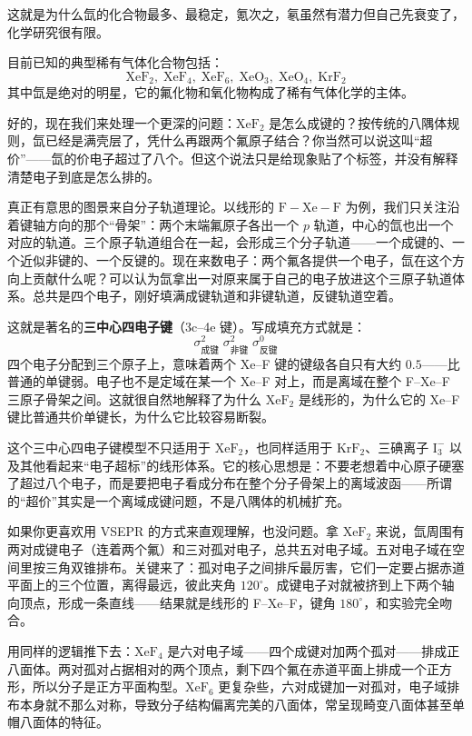 \documentclass[UTF8]{ctexbook}
\begin{document}
这就是为什么氙的化合物最多、最稳定，氪次之，氡虽然有潜力但自己先衰变了，化学研究很有限。

目前已知的典型稀有气体化合物包括：
\[
\mathrm{XeF_2,\; XeF_4,\; XeF_6,\; XeO_3,\; XeO_4,\; KrF_2}
\]
其中氙是绝对的明星，它的氟化物和氧化物构成了稀有气体化学的主体。

\medskip

好的，现在我们来处理一个更深的问题：$\mathrm{XeF_2}$ 是怎么成键的？按传统的八隅体规则，氙已经是满壳层了，凭什么再跟两个氟原子结合？你当然可以说这叫“超价”——氙的价电子超过了八个。但这个说法只是给现象贴了个标签，并没有解释清楚电子到底是怎么排的。

真正有意思的图景来自分子轨道理论。以线形的 $\mathrm{F\!-\!Xe\!-\!F}$ 为例，我们只关注沿着键轴方向的那个“骨架”：两个末端氟原子各出一个 $p$ 轨道，中心的氙也出一个对应的轨道。三个原子轨道组合在一起，会形成三个分子轨道——一个成键的、一个近似非键的、一个反键的。现在来数电子：两个氟各提供一个电子，氙在这个方向上贡献什么呢？可以认为氙拿出一对原来属于自己的电子放进这个三原子轨道体系。总共是四个电子，刚好填满成键轨道和非键轨道，反键轨道空着。

这就是著名的\textbf{三中心四电子键}（3c--4e 键）。写成填充方式就是：
\[
\sigma_{\text{成键}}^2\; \sigma_{\text{非键}}^2\; \sigma_{\text{反键}}^0
\]
四个电子分配到三个原子上，意味着两个 Xe--F 键的键级各自只有大约 $0.5$——比普通的单键弱。电子也不是定域在某一个 Xe--F 对上，而是离域在整个 F--Xe--F 三原子骨架之间。这就很自然地解释了为什么 $\mathrm{XeF_2}$ 是线形的，为什么它的 Xe--F 键比普通共价单键长，为什么它比较容易断裂。

这个三中心四电子键模型不只适用于 $\mathrm{XeF_2}$，也同样适用于 $\mathrm{KrF_2}$、三碘离子 $\mathrm{I_3^-}$ 以及其他看起来“电子超标”的线形体系。它的核心思想是：不要老想着中心原子硬塞了超过八个电子，而是要把电子看成分布在整个分子骨架上的离域波函——所谓的“超价”其实是一个离域成键问题，不是八隅体的机械扩充。

\medskip

如果你更喜欢用 VSEPR 的方式来直观理解，也没问题。拿 $\mathrm{XeF_2}$ 来说，氙周围有两对成键电子（连着两个氟）和三对孤对电子，总共五对电子域。五对电子域在空间里按三角双锥排布。关键来了：孤对电子之间排斥最厉害，它们一定要占据赤道平面上的三个位置，离得最远，彼此夹角 $120^\circ$。成键电子对就被挤到上下两个轴向顶点，形成一条直线——结果就是线形的 F--Xe--F，键角 $180^\circ$，和实验完全吻合。

用同样的逻辑推下去：$\mathrm{XeF_4}$ 是六对电子域——四个成键对加两个孤对——排成正八面体。两对孤对占据相对的两个顶点，剩下四个氟在赤道平面上排成一个正方形，所以分子是正方平面构型。$\mathrm{XeF_6}$ 更复杂些，六对成键加一对孤对，电子域排布本身就不那么对称，导致分子结构偏离完美的八面体，常呈现畸变八面体甚至单帽八面体的特征。
\end{document}
